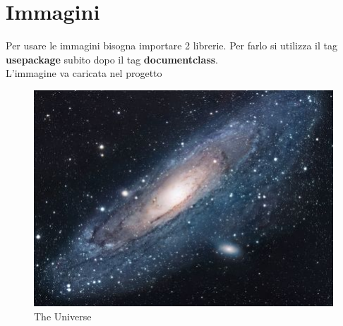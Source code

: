 \documentclass{article}
\begin{document}
\section{Immagini}
Per usare le immagini bisogna importare 2 librerie. Per farlo si utilizza il tag \textbf{usepackage} subito dopo il tag \textbf{documentclass}. \\ 
L'immagine va caricata nel progetto 
\begin{figure}[h!]
    \centering
    \includegraphics[scale=1.7]{universe.jpg}
    \caption{The Universe }
    \label{fig:my_label}
\end{figure}
\end{document}
